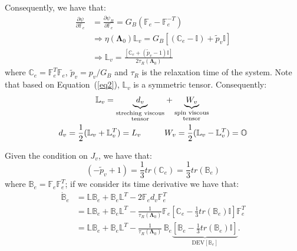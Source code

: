 \documentclass[12pt]{extarticle}
\newcommand{\F}{\ensuremath{\mathbb{F}}}
\newcommand{\LL}{\ensuremath{\mathbb{L}}}
\begin{document}
Consequently, we have that:
\begin{equation}
\begin{aligned}
\frac{\partial \psi}{\partial \F_e}&=\frac{\partial \psi_B}{\partial \F_e}= G_B (\F_e-\F_e^{-T})\\%
&\Longrightarrow
\eta(\boldsymbol{\Lambda}_0)\LL_v=G_B \left[\left(\mathbb{C}_e-\mathbb{I}\right)+\tilde{p}_v\mathbb{I}\right]\\
&\Longrightarrow \LL_v= \frac{\left[\mathbb{C}_e+(\tilde{p}_v-1)\mathbb{I}\right]}{ 2\tau_R(\boldsymbol{\Lambda}_0)}
\end{aligned}
\label{eq2}
\end{equation} 
where $\mathbb{C}_e=\F_e^T\F_e$, $\tilde{p}_v=p_v/G_B$ and $\tau_R$ is the relaxation time of the system. Note that based on Equation~(\ref{eq2}), $\LL_v$ is a symmetric tensor. Consequently:
\begin{equation}
\begin{aligned}
\LL_v = \underbrace{d_v}_{\substack{\text{streching viscous} \\ \text{tensor}}}& +\underbrace{W_v}_{\substack{\text{spin viscous} \\ \text{tensor}}} \\
d_v=\frac{1}{2} (\LL_v+\LL_v^T)=L_v\hspace{10mm}& W_v=\frac{1}{2} (\LL_v-\LL_v^T)= \mathbb{O}
\end{aligned}
\end{equation}

Given the condition on $J_v$, we have that:
\begin{equation}
(-\tilde{p}_v+1)=\frac{1}{3}tr(\mathbb{C}_e)=\frac{1}{3} tr(\mathbb{B}_e)
\end{equation}
where $\mathbb{B}_e=\F_e\F_e^T$; if we consider its time derivative we have that:
\begin{equation}
\begin{aligned}
\dot{\mathbb{B}}_e &= \LL \mathbb{B}_e + \mathbb{B}_e \LL^T - 2 \F_e d_v \F_e^{T} \\
&= \LL\mathbb{B}_e + \mathbb{B}_e \LL^T - \frac{1}{\tau_R(\boldsymbol{\Lambda}_0)} \F_e\left[\mathbb{C}_e-\frac{1}{3}tr(\mathbb{B}_e)\mathbb{I}\right]\F_e^T\\
&= \LL\mathbb{B}_e + \mathbb{B}_e \LL^T - \frac{1}{\tau_R(\boldsymbol{\Lambda}_0)} \,\mathbb{B}_e\underbrace{\left[\mathbb{B}_e-\frac{1}{3}tr(\mathbb{B}_e)\mathbb{I}\right]}_{\text{DEV}[\mathbb{B}_e]}.
\end{aligned}
\end{equation}
\end{document}
